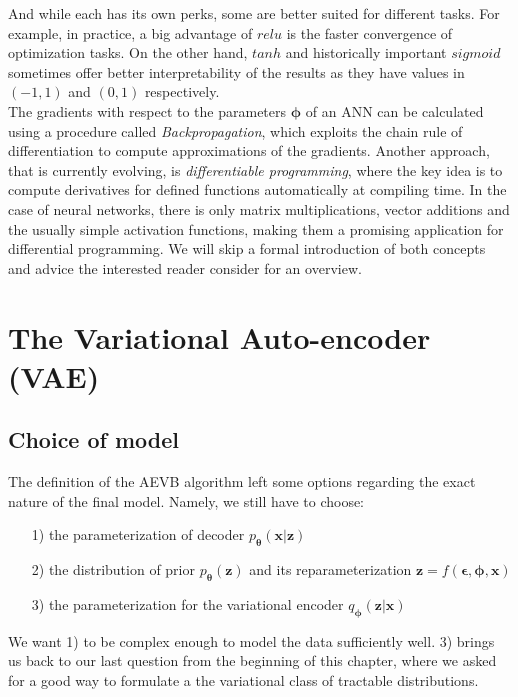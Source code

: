 \documentclass[12pt]{report}
\theoremstyle{definition}
\begin{document}
And while each has its own perks, some are better suited for different tasks. For example, in practice, a big advantage of $relu$ is the faster convergence of optimization tasks. On the other hand, $tanh$ and historically important $sigmoid$ sometimes offer better interpretability of the results as they have values in $(-1, 1)$ and $(0, 1)$ respectively. \\
The gradients with respect to the parameters $\pmb{\phi}$ of an ANN can be calculated using a procedure called \emph{Backpropagation}, which exploits the chain rule of differentiation to compute approximations of the gradients. Another approach, that is currently evolving, is \emph{differentiable programming}, where the key idea is to compute derivatives for defined functions automatically at compiling time. In the case of neural networks, there is only matrix multiplications, vector additions and the usually simple activation functions, making them a promising application for differential programming. We will skip a formal introduction of both concepts and advice the interested reader consider \cite{diff} for an overview.

\section{The Variational Auto-encoder (VAE)}
\subsection{Choice of model}

The definition of the AEVB algorithm left some options regarding the exact nature of the final model. Namely, we still have to choose:
\begin{itemize}
\item[1)] the parameterization of decoder $p_{\pmb{\theta}}(\mathbf{x}|\mathbf{z})$
\item[2)] the distribution of prior $p_{\pmb{\theta}}(\mathbf{z})$ and its reparameterization $\mathbf{z} = f(\pmb{\epsilon}, \pmb{\phi}, \mathbf{x})$
\item[3)] the parameterization for the variational encoder $q_{\pmb{\phi}}(\mathbf{z}|\mathbf{x})$
\end{itemize}
We want 1) to be complex enough to model the data sufficiently well. 3) brings us back to our last question from the beginning of this chapter, where we asked for a good way to formulate a the variational class of tractable distributions.
\end{document}
